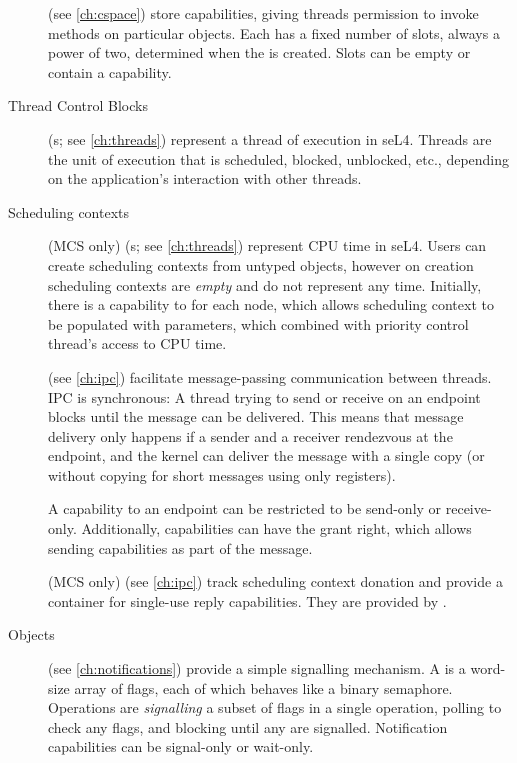 \begin{description}

    \item[] (see \autoref{ch:cspace}) store capabilities, giving threads permission to
    invoke methods on particular objects.
    Each  has a fixed number of slots,
    always a power of two, determined when the  is created. Slots
    can be empty or contain a capability.

    \item[Thread Control Blocks] (s; see \autoref{ch:threads}) represent a thread of
    execution in seL4. Threads are the unit of execution that is
    scheduled, blocked, unblocked, etc., depending on the application's
    interaction with other threads.

   \item[Scheduling contexts] (MCS only) (s; see \autoref{ch:threads}) represent
       CPU time in seL4. Users can create scheduling contexts from untyped objects, however on
       creation scheduling contexts are \textit{empty} and do not represent any time.
       Initially, there is a capability to  for each node, which
       allows scheduling context to be populated with parameters, which combined with priority
       control thread's access to CPU time.

    \item[] (see \autoref{ch:ipc}) facilitate message-passing
    communication between threads. IPC is synchronous: A thread
    trying to send or receive on an endpoint blocks until the message
    can be delivered. This means that message delivery only happens if
    a sender and a receiver rendezvous at the endpoint, and the
    kernel can deliver the message with a single copy (or without
    copying for short messages using only registers).

    A capability to an endpoint can be restricted to be
    send-only or receive-only. Additionally, 
    capabilities can have the grant right, which allows sending
    capabilities as part of the message.

   \item[] (MCS only) (see \autoref{ch:ipc}) track scheduling
    context donation and provide a container for single-use reply capabilities.
    They are provided by .

    \item[ Objects] (see \autoref{ch:notifications})
      provide a simple signalling mechanism. A 
      is a word-size array of flags, each of which behaves like a binary semaphore. Operations
      are \emph{signalling} a subset of flags in a single operation,
      polling to check any flags, 
      and blocking until any are signalled. Notification capabilities
      can be signal-only or wait-only.


\end{description}
